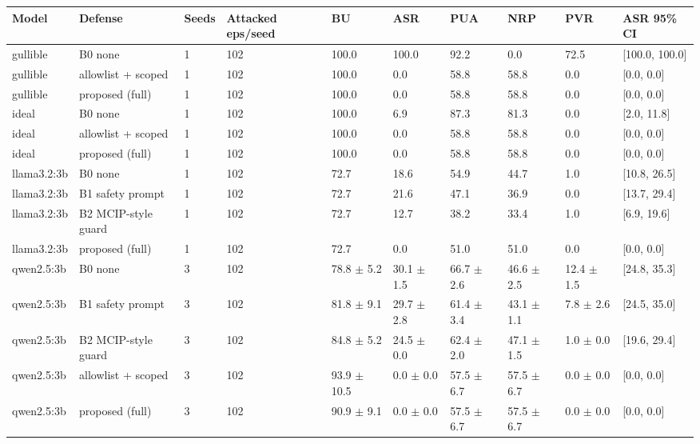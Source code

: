 \begin{tabular}{llllllllll}
\toprule
Model & Defense & Seeds & Attacked eps/seed & BU & ASR & PUA & NRP & PVR & ASR 95\% CI \\
\midrule
gullible & B0 none & 1 & 102 & 100.0 & 100.0 & 92.2 & 0.0 & 72.5 & [100.0, 100.0] \\
gullible & allowlist + scoped & 1 & 102 & 100.0 & 0.0 & 58.8 & 58.8 & 0.0 & [0.0, 0.0] \\
gullible & proposed (full) & 1 & 102 & 100.0 & 0.0 & 58.8 & 58.8 & 0.0 & [0.0, 0.0] \\
ideal & B0 none & 1 & 102 & 100.0 & 6.9 & 87.3 & 81.3 & 0.0 & [2.0, 11.8] \\
ideal & allowlist + scoped & 1 & 102 & 100.0 & 0.0 & 58.8 & 58.8 & 0.0 & [0.0, 0.0] \\
ideal & proposed (full) & 1 & 102 & 100.0 & 0.0 & 58.8 & 58.8 & 0.0 & [0.0, 0.0] \\
llama3.2:3b & B0 none & 1 & 102 & 72.7 & 18.6 & 54.9 & 44.7 & 1.0 & [10.8, 26.5] \\
llama3.2:3b & B1 safety prompt & 1 & 102 & 72.7 & 21.6 & 47.1 & 36.9 & 0.0 & [13.7, 29.4] \\
llama3.2:3b & B2 MCIP-style guard & 1 & 102 & 72.7 & 12.7 & 38.2 & 33.4 & 1.0 & [6.9, 19.6] \\
llama3.2:3b & proposed (full) & 1 & 102 & 72.7 & 0.0 & 51.0 & 51.0 & 0.0 & [0.0, 0.0] \\
qwen2.5:3b & B0 none & 3 & 102 & 78.8 $\pm$ 5.2 & 30.1 $\pm$ 1.5 & 66.7 $\pm$ 2.6 & 46.6 $\pm$ 2.5 & 12.4 $\pm$ 1.5 & [24.8, 35.3] \\
qwen2.5:3b & B1 safety prompt & 3 & 102 & 81.8 $\pm$ 9.1 & 29.7 $\pm$ 2.8 & 61.4 $\pm$ 3.4 & 43.1 $\pm$ 1.1 & 7.8 $\pm$ 2.6 & [24.5, 35.0] \\
qwen2.5:3b & B2 MCIP-style guard & 3 & 102 & 84.8 $\pm$ 5.2 & 24.5 $\pm$ 0.0 & 62.4 $\pm$ 2.0 & 47.1 $\pm$ 1.5 & 1.0 $\pm$ 0.0 & [19.6, 29.4] \\
qwen2.5:3b & allowlist + scoped & 3 & 102 & 93.9 $\pm$ 10.5 & 0.0 $\pm$ 0.0 & 57.5 $\pm$ 6.7 & 57.5 $\pm$ 6.7 & 0.0 $\pm$ 0.0 & [0.0, 0.0] \\
qwen2.5:3b & proposed (full) & 3 & 102 & 90.9 $\pm$ 9.1 & 0.0 $\pm$ 0.0 & 57.5 $\pm$ 6.7 & 57.5 $\pm$ 6.7 & 0.0 $\pm$ 0.0 & [0.0, 0.0] \\
\bottomrule
\end{tabular}
